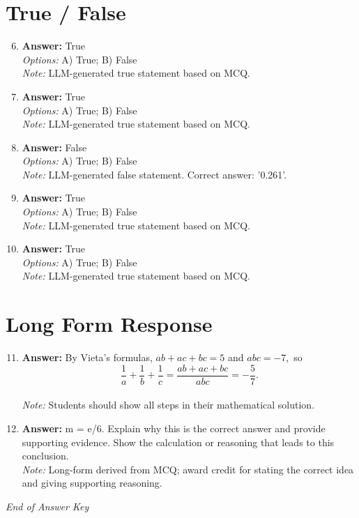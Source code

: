 \documentclass[12pt]{article}
\begin{document}
\section*{True / False}
\begin{enumerate}[label=\arabic*.]
\setcounter{enumi}{5}
\item \textbf{Answer:} True
\\ \textit{Options:} A) True; B) False
\\ \textit{Note:} LLM-generated true statement based on MCQ.
\item \textbf{Answer:} True
\\ \textit{Options:} A) True; B) False
\\ \textit{Note:} LLM-generated true statement based on MCQ.
\item \textbf{Answer:} False
\\ \textit{Options:} A) True; B) False
\\ \textit{Note:} LLM-generated false statement. Correct answer: '0.261'.
\item \textbf{Answer:} True
\\ \textit{Options:} A) True; B) False
\\ \textit{Note:} LLM-generated true statement based on MCQ.
\item \textbf{Answer:} True
\\ \textit{Options:} A) True; B) False
\\ \textit{Note:} LLM-generated true statement based on MCQ.
\end{enumerate}

\section*{Long Form Response}
\begin{enumerate}[label=\arabic*.]
\setcounter{enumi}{10}
\item \textbf{Answer:} By Vieta's formulas, $ab + ac + bc = 5$ and $abc = -7,$ so \[\frac{1}{a} + \frac{1}{b} + \frac{1}{c} = \frac{ab + ac + bc}{abc} = \boxed{-\frac{5}{7}}.\]
\\ \textit{Note:} Students should show all steps in their mathematical solution.
\item \textbf{Answer:} m = e/6. Explain why this is the correct answer and provide supporting evidence. Show the calculation or reasoning that leads to this conclusion.
\\ \textit{Note:} Long-form derived from MCQ; award credit for stating the correct idea and giving supporting reasoning.
\end{enumerate}

\vfill
\noindent\textit{End of Answer Key}
\end{document}
